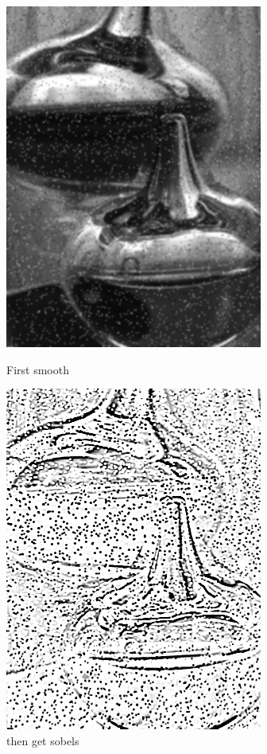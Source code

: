 \documentclass{article}
\begin{document}
\begin{figure}[h]
\begin{minipage}[b]{0.5\linewidth}
\centering
\includegraphics[scale=0.45]{firstblur.PNG}
\caption{First smooth}	
\end{minipage}
\begin{minipage}[b]{0.5\linewidth}
\centering
\includegraphics[scale=0.45]{thensobel.PNG}
\caption{then get sobels}
\end{minipage}
\end{figure}
\end{document}
